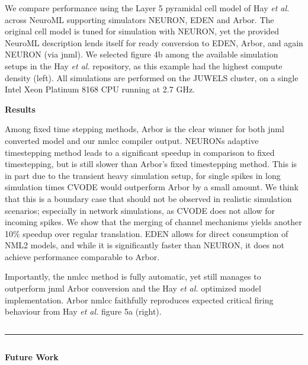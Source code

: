 \documentclass{beamer}
\begin{document}
\begin{frame}[t, fragile]
\begin{columns}
\begin{column}{0.73\textwidth}
\begin{columns}[t]
\begin{column}[t]{0.54\textwidth}
          We compare performance using the Layer 5 pyramidal cell model of Hay
          \emph{et al.} across NeuroML supporting simulators NEURON, EDEN and Arbor.
          The original cell model is tuned for simulation with NEURON, yet the
          provided NeuroML description lends itself for ready conversion to EDEN,
          Arbor, and again NEURON (via jnml). We selected figure 4b among the
          available simulation setups in the Hay \emph{et al.} repository, as this
          example had the highest compute density (left). All simulations are
          performed on the JUWELS cluster, on a single Intel Xeon Platinum 8168 CPU
          running at 2.7 GHz.

          \textbf{Results}

          Among fixed time stepping methods, Arbor is the clear winner for both jnml
          converted model and our nmlcc compiler output. NEURONs adaptive
          timestepping method leads to a significant speedup in comparison to fixed
          timestepping, but is still slower than Arbor's fixed timestepping method.
          This is in part due to the transient heavy simulation setup, for single
          spikes in long simulation times CVODE would outperform Arbor by a small
          amount. We think that this is a boundary case that should not be observed
          in realistic simulation scenarios; especially in network simulations, as
          CVODE does not allow for incoming spikes. We show that the merging of
          channel mechanisms yields another 10\% speedup over regular translation.
          EDEN allows for direct consumption of NML2 models, and while it is
          significantly faster than NEURON, it does not achieve performance
          comparable to Arbor.

          Importantly, the nmlcc method is fully automatic, yet still manages to
          outperform jnml Arbor conversion and the Hay \emph{et al.} optimized model
          implementation. Arbor nmlcc faithfully reproduces expected critical firing
          behaviour from Hay \emph{et al.} figure 5a (right).
        \end{column}
      \end{columns}
      \vspace*{1ex}
      \textcolor{arbred}{\rule{\textwidth}{0.59ex}}
      \vspace*{-1ex}
      \begin{columns}[t]
        \begin{column}[t]{0.49\textwidth}
          \textbf{Future Work}


\end{column}
\end{columns}
\end{column}
\end{columns}
\end{frame}
\end{document}
